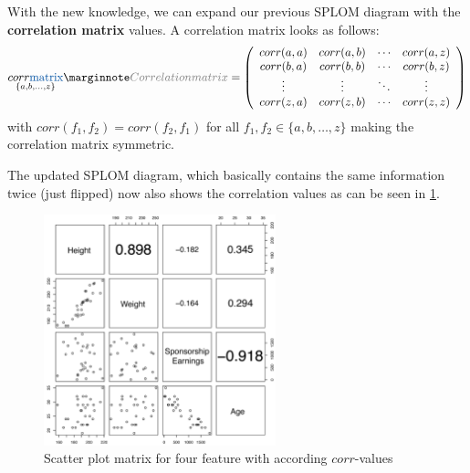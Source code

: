 With the new knowledge, we can expand our previous SPLOM diagram with the \textbf{correlation matrix} values. A correlation matrix looks as follows:
\begin{align*}
  \underset{\{a, b, \dots, z\}}{corr\text{\color{mathblue}  matrix}}\sidenote{Correlation matrix} = \left(\begin{array}{cccc}
    corr(a,a) & corr(a,b) & \cdots & corr(a,z)\\
    corr(b,a) & corr(b,b) & \cdots & corr(b,z)\\
    \vdots & \vdots & \ddots & \vdots\\
    corr(z,a) & corr(z,b) & \cdots & corr(z,z)
  \end{array}\right)
\end{align*}
with $corr(f_1, f_2) = corr(f_2, f_1)$ for all $f_1, f_2 \in \{a, b, \dots, z\}$ making the correlation matrix symmetric.

The updated SPLOM diagram, which basically contains the same information twice (just flipped) now also shows the correlation values as can be seen in \ref{fig:2_splom_corr}.
\begin{figure}[H]
  \centering
  \includegraphics[width=0.6\textwidth]{assets/visualization_and_extraction/feature_relation/splom_updated.png}
  \caption{Scatter plot matrix for four feature with according $corr$-values}
  \label{fig:2_splom_corr}
\end{figure}
